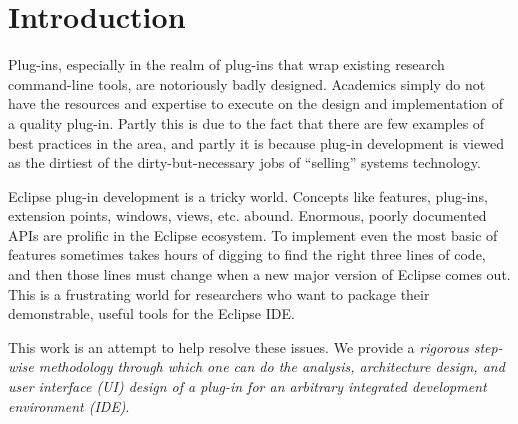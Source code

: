 \documentclass[letterpaper,conference]{IEEEtran}
\newcommand{\etc}{etc.\xspace}
\begin{document}

%
\IEEEpeerreviewmaketitle


\section{Introduction}
\label{sec:introduction}

Plug-ins, especially in the realm of plug-ins that wrap existing
research command-line tools, are notoriously badly designed.
Academics simply do not have the resources and expertise to execute on
the design and implementation of a quality plug-in.  Partly this is due
to the fact that there are few examples of best practices in the area,
and partly it is because plug-in development is viewed as the dirtiest
of the dirty-but-necessary jobs of ``selling'' systems technology.


Eclipse plug-in development is a tricky world.  Concepts like
features, plug-ins, extension points, windows, views, \etc abound.
Enormous, poorly documented APIs are prolific in the Eclipse
ecosystem.  To implement even the most basic of features sometimes
takes hours of digging to find the right three lines of code, and then
those lines must change when a new major version of Eclipse comes out.
This is a frustrating world for researchers who want to package their
demonstrable, useful tools for the Eclipse IDE.

This work is an attempt to help resolve these issues.  
We
provide a \emph{rigorous step-wise methodology through which one can
  do the analysis, architecture design, and user interface (UI) design
  of a plug-in for an arbitrary integrated development environment
  (IDE)}.  
\end{document}
